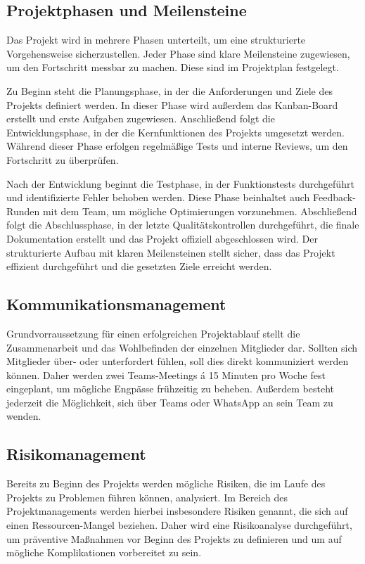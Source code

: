 \documentclass[a4paper,12pt]{article}
\begin{document}
    \subsection{Projektphasen und Meilensteine} Das Projekt wird in mehrere Phasen unterteilt, um eine strukturierte Vorgehensweise sicherzustellen. Jeder Phase sind klare Meilensteine zugewiesen, um den Fortschritt messbar zu machen. Diese sind im Projektplan festgelegt.
    
    Zu Beginn steht die Planungsphase, in der die Anforderungen und Ziele des Projekts definiert werden. In dieser Phase wird außerdem das Kanban-Board erstellt und erste Aufgaben zugewiesen. Anschließend folgt die Entwicklungsphase, in der die Kernfunktionen des Projekts umgesetzt werden. Während dieser Phase erfolgen regelmäßige Tests und interne Reviews, um den Fortschritt zu überprüfen.

    Nach der Entwicklung beginnt die Testphase, in der Funktionstests durchgeführt und identifizierte Fehler behoben werden. Diese Phase beinhaltet auch Feedback-Runden mit dem Team, um mögliche Optimierungen vorzunehmen. Abschließend folgt die Abschlussphase, in der letzte Qualitätskontrollen durchgeführt, die finale Dokumentation erstellt und das Projekt offiziell abgeschlossen wird. Der strukturierte Aufbau mit klaren Meilensteinen stellt sicher, dass das Projekt effizient durchgeführt und die gesetzten Ziele erreicht werden.

    \subsection{Kommunikationsmanagement} Grundvorraussetzung für einen erfolgreichen Projektablauf stellt die Zusammenarbeit und das Wohlbefinden der einzelnen Mitglieder dar. Sollten sich Mitglieder über- oder unterfordert fühlen, soll dies direkt kommuniziert werden können. Daher werden zwei Teams-Meetings á 15 Minuten pro Woche fest eingeplant, um mögliche Engpässe frühzeitig zu beheben. Außerdem besteht jederzeit die Möglichkeit, sich über Teams oder WhatsApp an sein Team zu wenden.

    \subsection{Risikomanagement} Bereits zu Beginn des Projekts werden mögliche Risiken, die im Laufe des Projekts zu Problemen führen können, analysiert. Im Bereich des Projektmanagements werden hierbei insbesondere Risiken genannt, die sich auf einen Ressourcen-Mangel beziehen. Daher wird eine Risikoanalyse durchgeführt, um präventive Maßnahmen vor Beginn des Projekts zu definieren und um auf mögliche Komplikationen vorbereitet zu sein.
\end{document}
